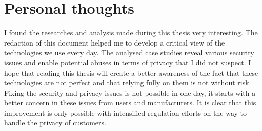 \section{Personal thoughts}

I found the researches and analysis made during this thesis very interesting.
The redaction of this document helped me to develop a critical view of the technologies we use every day.
The analysed case studies reveal various security issues and enable potential abuses in terms of privacy that I did not suspect.
I hope that reading this thesis will create a better awareness of the fact that these technologies are not perfect and that relying fully on them is not without risk.
Fixing the security and privacy issues is not possible in one day, it starts with a better concern in these issues from users and manufacturers. %
It is clear that this improvement is only possible with intensified regulation efforts on the way to handle the privacy of customers.
